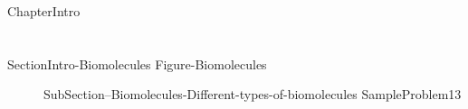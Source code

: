 \documentclass[main.tex]{subfiles}
\newcommand\chapterlabel{Ch-biochemistry}\setcounter{figurenewcounter}{0}\setcounter{tablenewcounter}{0}\setcounter{formulanewcounter}{0}\chapterpicture{../{\chapterlabel}/figure1}\chapterpicturelabel{PxFuel}
\begin{document}
  \iftoggle{chem121}{}{
{ChapterName}  
}
 \iftoggle{chem121}{
 \setcounter{chapter}{11} {ChapterName}  
}{}  


 {ChapterIntro}

%
%


\section{\color{blue!30!black}{Biomolecules}}
{SectionIntro-Biomolecules}
{Figure-Biomolecules}
\sloppy\begin{description}
\item[] {SubSection--Biomolecules-Different-types-of-biomolecules}
{SampleProblem13}
\end{description}
\end{document}
